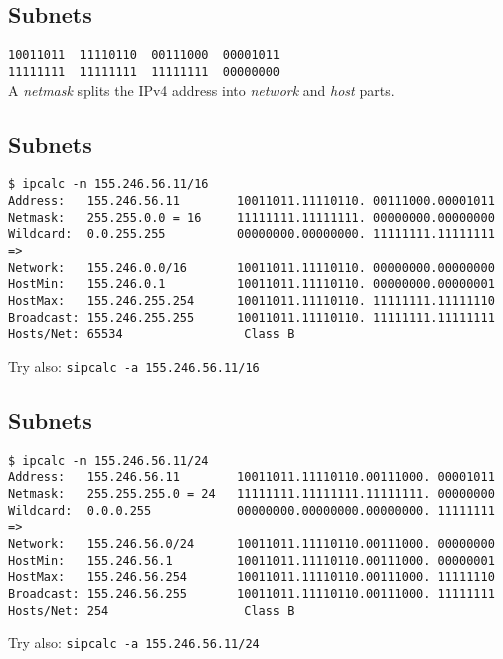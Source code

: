 \documentclass[xga]{xdvislides}
\begin{document}
\subsection{Subnets}
\vspace{.5in}
\Hugesize
\begin{center}
\verb|10011011  11110110  00111000  00001011| \\

\verb|11111111  11111111  11111111  00000000| \\
\vspace{.5in}
A {\em netmask} splits the IPv4 address into {\em network} and {\em host}
parts.
\end{center}
\Normalsize

\subsection{Subnets}
\begin{verbatim}
$ ipcalc -n 155.246.56.11/16
Address:   155.246.56.11        10011011.11110110. 00111000.00001011
Netmask:   255.255.0.0 = 16     11111111.11111111. 00000000.00000000
Wildcard:  0.0.255.255          00000000.00000000. 11111111.11111111
=>
Network:   155.246.0.0/16       10011011.11110110. 00000000.00000000
HostMin:   155.246.0.1          10011011.11110110. 00000000.00000001
HostMax:   155.246.255.254      10011011.11110110. 11111111.11111110
Broadcast: 155.246.255.255      10011011.11110110. 11111111.11111111
Hosts/Net: 65534                 Class B
\end{verbatim}
\vspace{.5in}
Try also: \verb+sipcalc -a 155.246.56.11/16+

\subsection{Subnets}
\begin{verbatim}
$ ipcalc -n 155.246.56.11/24
Address:   155.246.56.11        10011011.11110110.00111000. 00001011
Netmask:   255.255.255.0 = 24   11111111.11111111.11111111. 00000000
Wildcard:  0.0.0.255            00000000.00000000.00000000. 11111111
=>
Network:   155.246.56.0/24      10011011.11110110.00111000. 00000000
HostMin:   155.246.56.1         10011011.11110110.00111000. 00000001
HostMax:   155.246.56.254       10011011.11110110.00111000. 11111110
Broadcast: 155.246.56.255       10011011.11110110.00111000. 11111111
Hosts/Net: 254                   Class B

\end{verbatim}
\vspace{.5in}
Try also: \verb+sipcalc -a 155.246.56.11/24+
\end{document}

